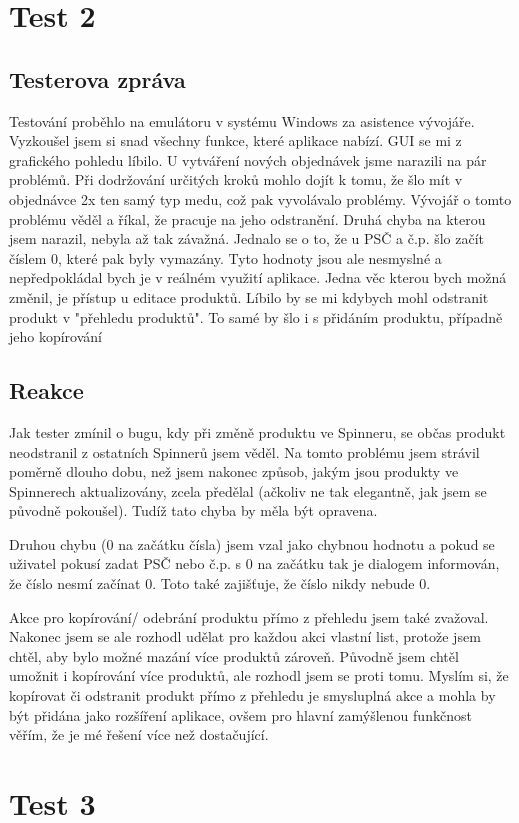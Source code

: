 \documentclass[12pt]{report}
\begin{document}
\section{Test 2}
\subsection{Testerova zpráva}
Testování proběhlo na emulátoru v systému Windows za asistence vývojáře. Vyzkoušel jsem si snad všechny funkce, které aplikace nabízí. GUI se mi z grafického pohledu líbilo.
U vytváření nových objednávek jsme narazili na pár problémů. Při dodržování určitých kroků mohlo dojít k tomu, že šlo mít v objednávce 2x ten samý typ medu, což pak vyvolávalo problémy. Vývojář o tomto problému věděl a říkal, že pracuje na jeho odstranění. Druhá chyba na kterou jsem narazil, nebyla až tak závažná. Jednalo se o to, že u PSČ a č.p. šlo začít číslem 0, které pak byly vymazány. Tyto hodnoty jsou ale nesmyslné a nepředpokládal bych je v reálném využití aplikace.
Jedna věc kterou bych možná změnil, je přístup u editace produktů. Líbilo by se mi kdybych mohl odstranit produkt v "přehledu produktů". To samé by šlo i s přidáním produktu, případně jeho kopírování
\subsection{Reakce}
Jak tester zmínil o bugu, kdy při změně produktu ve Spinneru, se občas produkt neodstranil z ostatních 
Spinnerů jsem věděl. Na tomto problému jsem strávil poměrně dlouho dobu, než jsem nakonec způsob,
jakým jsou produkty ve Spinnerech aktualizovány, zcela předělal (ačkoliv ne tak elegantně, 
jak jsem se původně pokoušel). Tudíž tato chyba by měla být opravena.

Druhou chybu (0 na začátku čísla) jsem vzal jako chybnou hodnotu a pokud se uživatel pokusí 
zadat PSČ nebo č.p. s 0 na začátku tak je dialogem informován, že číslo nesmí začínat 0. Toto také
zajišťuje, že číslo nikdy nebude 0.

Akce pro kopírování/ odebrání produktu přímo z přehledu jsem také zvažoval. Nakonec jsem se
ale rozhodl udělat pro každou akci vlastní list, protože jsem chtěl, aby bylo možné mazání více
produktů zároveň. Původně jsem chtěl umožnit i kopírování více produktů, ale rozhodl
jsem se proti tomu. Myslím si, že kopírovat či odstranit produkt přímo z přehledu je smysluplná
akce a mohla by být přidána jako rozšíření aplikace, ovšem pro hlavní zamýšlenou funkčnost věřím,
že je mé řešení více než dostačující.
\section{Test 3}
\end{document}
